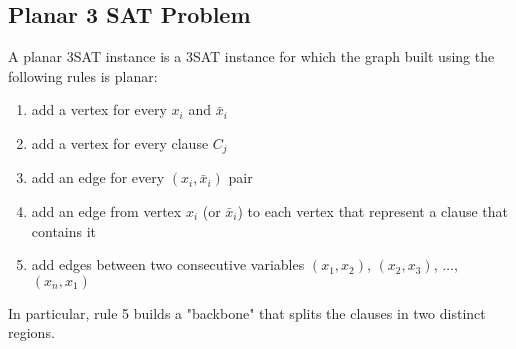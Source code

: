 \subsection{Planar 3 SAT Problem}
\begin{prob}
 A planar 3SAT instance is a 3SAT instance for which the graph built using the following rules is 
planar:
\begin{enumerate}
 \item add a vertex for every $x_i$ and $\bar{x}_i$
 \item add a vertex for every clause $C_j$
 \item add an edge for every $\left(x_i,\bar{x}_i \right)$ pair
 \item add an edge from vertex $x_i$ (or $\bar{x}_i$) to each vertex that represent a clause that 
contains it
 \item add edges between two consecutive variables $(x_1,x_2)$, $(x_2,x_3)$, $\dots$,$(x_n,x_1)$
\end{enumerate}
In particular, rule 5 builds a "backbone" that splits the clauses in two distinct regions.
\end{prob}

